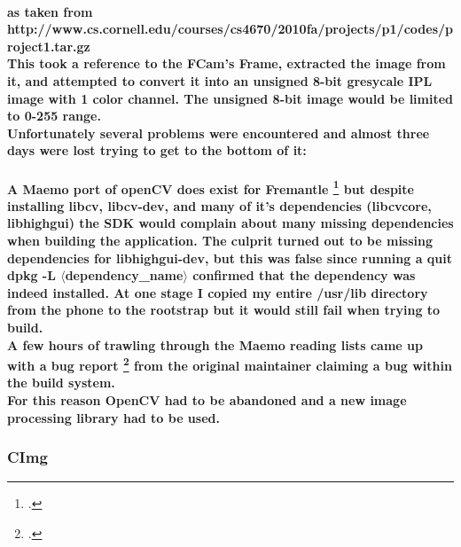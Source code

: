 \paragraph{as taken from http://www.cs.cornell.edu/courses/cs4670/2010fa/projects/p1/codes/project1.tar.gz\\
This took a reference to the FCam's Frame, extracted the image from it, and attempted to convert it into an unsigned 8-bit gresycale IPL image with 1 color channel. The unsigned 8-bit image would be limited to 0-255 range.\\
Unfortunately several problems were encountered and almost three days were lost trying to get to the bottom of it:}
\paragraph{
A Maemo port of openCV does exist for Fremantle \footcite{libcv} but despite installing libcv, libcv-dev, and many of it's dependencies (libcvcore, libhighgui) the SDK would complain about many missing dependencies when building the application. The culprit turned out to be missing dependencies for libhighgui-dev, but this was false since running a quit dpkg -L \(\langle\)dependency\_name\(\rangle\) confirmed that the dependency was indeed installed. At one stage I copied my entire /usr/lib directory from the phone to the rootstrap but it would still fail when trying to build.\\
A few hours of trawling through the Maemo reading lists came up with a bug report \footcite{highgui-dev} from the original maintainer claiming a bug within the build system.\\
For this reason OpenCV had to be abandoned and a new image processing library had to be used.
}
\subsubsection{CImg}
